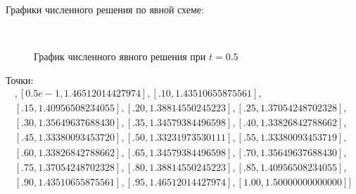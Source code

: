 \documentclass[14pt,a4paper]{scrartcl}
\begin{document}
\pagebreak

Графики численного решения по явной схеме: 


\begin{figure}[H]
	\begin{minipage}[h]{1\linewidth}
		\\
		\caption{График численного явного решения при $t=0.5$}
	\end{minipage}
\end{figure}

Точки:
\begin{align*}
	[[0., 1.50000000000000], [0.5e-1, 1.46512014427974], [.10, 1.43510655875561],\\
	 [.15, 1.40956508234055], [.20, 1.38814550245223], [.25, 1.37054248702328], \\
	 [.30, 1.35649637688430], [.35, 1.34579384496598], [.40, 1.33826842788662], \\
	 [.45, 1.33380093453720], [.50, 1.33231973530111], [.55, 1.33380093453719], \\
	 [.60, 1.33826842788662], [.65, 1.34579384496598], [.70, 1.35649637688430], \\
	 [.75, 1.37054248702328], [.80, 1.38814550245223], [.85, 1.40956508234055], \\
	 [.90, 1.43510655875561], [.95, 1.46512014427974], [1.00, 1.50000000000000]]
\end{align*}

\pagebreak
\end{document}
